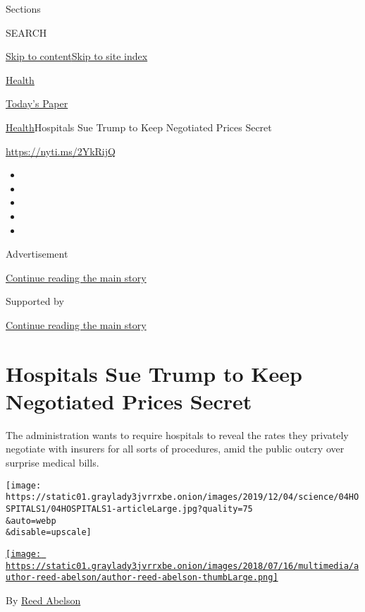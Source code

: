 Sections

SEARCH

\protect\hyperlink{site-content}{Skip to
content}\protect\hyperlink{site-index}{Skip to site index}

\href{https://www.nytimes3xbfgragh.onion/section/health}{Health}

\href{https://myaccount.nytimes3xbfgragh.onion/auth/login?response_type=cookie\&client_id=vi}{}

\href{https://www.nytimes3xbfgragh.onion/section/todayspaper}{Today's
Paper}

\href{/section/health}{Health}\textbar{}Hospitals Sue Trump to Keep
Negotiated Prices Secret

\url{https://nyti.ms/2YkRijQ}

\begin{itemize}
\item
\item
\item
\item
\item
\end{itemize}

Advertisement

\protect\hyperlink{after-top}{Continue reading the main story}

Supported by

\protect\hyperlink{after-sponsor}{Continue reading the main story}

\hypertarget{hospitals-sue-trump-to-keep-negotiated-prices-secret}{%
\section{Hospitals Sue Trump to Keep Negotiated Prices
Secret}\label{hospitals-sue-trump-to-keep-negotiated-prices-secret}}

The administration wants to require hospitals to reveal the rates they
privately negotiate with insurers for all sorts of procedures, amid the
public outcry over surprise medical bills.

\texttt{[image: https://static01.graylady3jvrrxbe.onion/images/2019/12/04/science/04HOSPITALS1/04HOSPITALS1-articleLarge.jpg?quality=75\\\&auto=webp\\\&disable=upscale]}

\href{https://www.nytimes3xbfgragh.onion/by/reed-abelson}{\texttt{[image: https://static01.graylady3jvrrxbe.onion/images/2018/07/16/multimedia/author-reed-abelson/author-reed-abelson-thumbLarge.png]}}

By \href{https://www.nytimes3xbfgragh.onion/by/reed-abelson}{Reed
Abelson}

